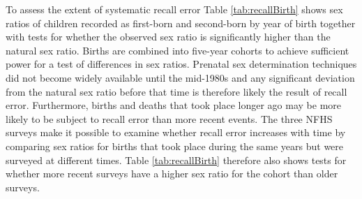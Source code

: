 \documentclass[12pt,letterpaper]{article}
\begin{document}
To assess the extent of systematic recall error Table \ref{tab:recallBirth} 
shows sex ratios of children recorded as first-born and second-born
by year of birth together with tests for whether the observed sex ratio is
significantly higher than the natural sex ratio.
Births are combined into five-year cohorts to achieve sufficient power for a test of 
differences in sex ratios.
Prenatal sex determination techniques did not become widely available until the 
mid-1980s and any significant deviation from the natural sex ratio before that time
is therefore likely the result of recall error.
Furthermore, births and deaths that took place longer ago may be more 
likely to be subject to recall error than more recent events.
The three NFHS surveys make it possible to examine whether recall error increases with 
time by comparing sex ratios for births that took place during the same years but were 
surveyed at different times.
Table \ref{tab:recallBirth} therefore also shows tests for whether more recent surveys 
have a higher sex ratio for the cohort than older surveys.



\end{document}
